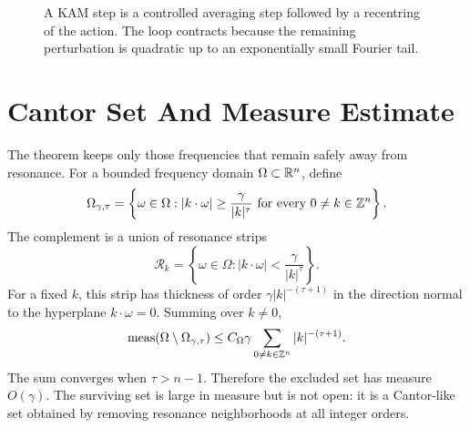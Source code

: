 \begin{figure}[htbp]
\centering
{}
\caption{A KAM step is a controlled averaging step followed by a recentring of
the action.  The loop contracts because the remaining perturbation is
quadratic up to an exponentially small Fourier tail.}
\label{fig:kam-newton-step}
\end{figure}

\section{Cantor Set And Measure Estimate}
\label{sec:kam-cantor-measure}

The theorem keeps only those frequencies that remain safely away from
resonance.  For a bounded frequency domain \(\Omega\subset\mathbb{R}^n\), define
\[
        \Omega_{\gamma,\tau}
        =
        \left\{\omega\in\Omega:
        |k\cdot\omega|\ge \frac{\gamma}{|k|^\tau}
        \text{ for every }0\ne k\in\mathbb{Z}^n\right\}.
\]
The complement is a union of resonance strips
\[
        \mathcal{R}_k
        =
        \left\{\omega\in\Omega:
        |k\cdot\omega|<\frac{\gamma}{|k|^\tau}\right\}.
\]
For a fixed \(k\), this strip has thickness of order
\(\gamma |k|^{-(\tau+1)}\) in the direction normal to the hyperplane
\(k\cdot\omega=0\).  Summing over \(k\ne0\),
\[
        \operatorname{meas}(\Omega\setminus\Omega_{\gamma,\tau})
        \le
        C_\Omega \gamma
        \sum_{0\ne k\in\mathbb{Z}^n}|k|^{-(\tau+1)} .
\]
The sum converges when \(\tau>n-1\).  Therefore the excluded set has measure
\(O(\gamma)\).  The surviving set is large in measure but is not open: it is a
Cantor-like set obtained by removing resonance neighborhoods at all integer
orders.

